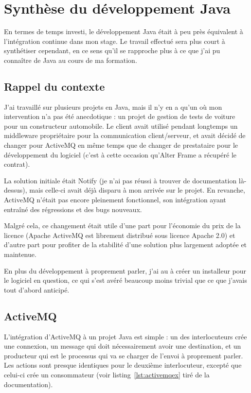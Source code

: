 \section{Synthèse du développement Java}
\label{sec:synthese_java}
En termes de temps investi, le développement Java était à peu près équivalent à l'intégration continue dans mon stage. Le travail effectué sera plus court à synthétiser cependant, en ce sens qu'il se rapproche plus à ce que j'ai pu connaître de Java au cours de ma formation.

\subsection{Rappel du contexte}
J'ai travaillé sur plusieurs projets en Java, mais il n'y en a qu'un où mon intervention n'a pas été anecdotique : un projet de gestion de tests de voiture pour un constructeur automobile. Le client avait utilisé pendant longtemps un middleware propriétaire pour la communication client/serveur, et avait décidé de changer pour ActiveMQ\cite{activemq} en même temps que de changer de prestataire pour le développement du logiciel (c'est à cette occasion qu'Alter Frame a récupéré le contrat).

La solution initiale était Notify (je n'ai pas réussi à trouver de documentation là-dessus), mais celle-ci avait déjà disparu à mon arrivée sur le projet. En revanche, ActiveMQ n'était pas encore pleinement fonctionnel, son intégration ayant entraîné des régressions et des bugs nouveaux.

Malgré cela, ce changement était utile d'une part pour l'économie du prix de la licence (Apache ActiveMQ est librement distribué sous licence Apache 2.0) et d'autre part pour profiter de la stabilité d'une solution plus largement adoptée et maintenue.

En plus du développement à proprement parler, j'ai au à créer un installeur pour le logiciel en question, ce qui s'est avéré beaucoup moins trivial que ce que j'avais tout d'abord anticipé.

\subsection{ActiveMQ}
L'intégration d'ActiveMQ à un projet Java est simple : un des interlocuteurs crée une connexion, un message qui doit nécessairement avoir une destination, et un producteur qui est le processus qui va se charger de l'envoi à proprement parler. Les actions sont presque identiques pour le deuxième interlocuteur, excepté que celui-ci crée un consommateur\cite{activemq_intro} (voir listing~\ref{lst:activemqex} tiré de la documentation).

